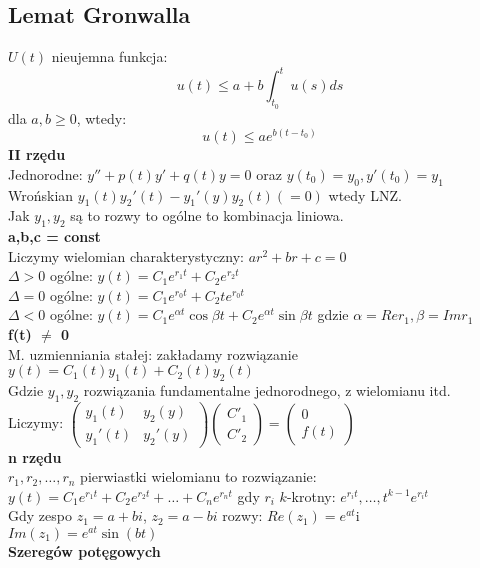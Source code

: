 \documentclass{article}
\begin{document}
\subsection*{Lemat Gronwalla}
$U(t)$ nieujemna funkcja:
$$
u(t) \leq a+ b\int_{t_0}^t u(s)ds
$$
dla $a,b \geq 0$, wtedy:
$$
u(t) \leq ae^{b(t-t_0)}
$$
\clearpage
\textbf{II rzędu}\\
Jednorodne: $y''+ p(t)y' + q(t)y = 0$ oraz $y(t_0) = y_0, y'(t_0)=y_1$\\
Wrońskian $y_1(t)y_2'(t)-y_1'(y)y_2(t)(= 0)$ wtedy LNZ.\\Jak $y_1,y_2$ są to rozwy to ogólne to kombinacja liniowa.\\
\textbf{a,b,c = const}\\
Liczymy wielomian charakterystyczny: $ar^2 + br + c = 0$\\
$\Delta > 0$ ogólne: $y(t) = C_1e^{r_1t} + C_2e^{r_2t}$\\
$\Delta = 0$ ogólne: $y(t) = C_1e^{r_0t} + C_2te^{r_0t}$\\
$\Delta < 0$ ogólne: $y(t) = C_1e^{\alpha t}\cos{\beta t} + C_2e^{\alpha t}\sin{\beta t}$ gdzie $\alpha = Re r_1, \beta = Im r_1$\\
\textbf{f(t) $\neq$ 0}\\
M. uzmienniania stałej: zakładamy rozwiązanie $y(t)=C_1(t)y_1(t)+C_2(t)y_2(t)$\\
Gdzie $y_1, y_2$ rozwiązania fundamentalne jednorodnego, z wielomianu itd.\\
Liczymy: $\begin{pmatrix} y_1(t) & y_2(y)\\ y_1'(t) & y_2'(y) \end{pmatrix} \begin{pmatrix} C'_1 \\ C'_2\end{pmatrix} = \begin{pmatrix} 0 \\ f(t)\end{pmatrix}$\\
\textbf{n rzędu}\\
$r_1,r_2,\ldots,r_n$ pierwiastki wielomianu to rozwiązanie:\\
$y(t) = C_1e^{r_1t}+C_2e^{r_2t}+\ldots+C_ne^{r_nt}$ gdy $r_i$ $k$-krotny: $e^{r_it},\ldots,t^{k-1}e^{r_it}$\\
Gdy zespo $z_1 = a +bi$, $z_2 = a-bi$ rozwy: $Re(z_1)=e^{at}$i $Im(z_1)=e^{at}\sin(bt)$\\
\textbf{Szeregów potęgowych}\\
\end{document}
